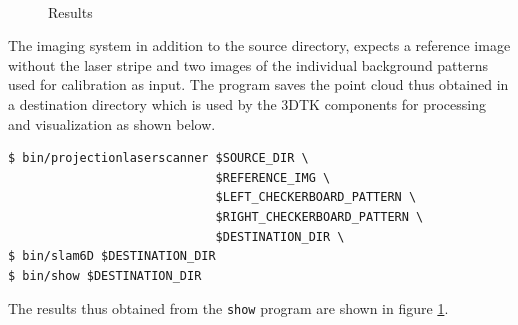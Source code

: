 \begin{figure}[ht!]
\\
\caption{Results}
\label{figure:results}
\end{figure}

The imaging system in addition to the source directory, expects a reference
image without the laser stripe and two images of the individual background
patterns used for calibration as input. The program saves the point cloud thus
obtained in a destination directory which is used by the \ac{3DTK} components
for processing and visualization as shown below.

\begin{verbatim}
$ bin/projectionlaserscanner $SOURCE_DIR \
                             $REFERENCE_IMG \
                             $LEFT_CHECKERBOARD_PATTERN \
                             $RIGHT_CHECKERBOARD_PATTERN \
                             $DESTINATION_DIR \
$ bin/slam6D $DESTINATION_DIR
$ bin/show $DESTINATION_DIR
\end{verbatim}

The results thus obtained from the \texttt{show} program are shown in figure
\ref{figure:results}.
